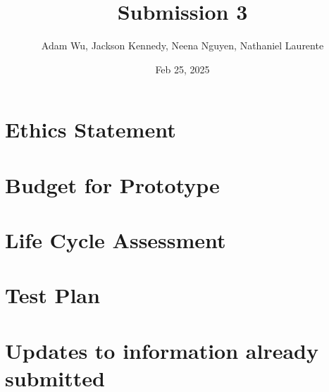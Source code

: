 \documentclass{article}
\title{Submission 3}
\author{Adam Wu, Jackson Kennedy, Neena Nguyen, Nathaniel Laurente}
\date{Feb 25, 2025}
\begin{document}
\maketitle
\tableofcontents
\newpage


\section{Ethics Statement}
\section{Budget for Prototype}
\section{Life Cycle Assessment}
\section{Test Plan}
\section{Updates to information already submitted}
\end{document}
